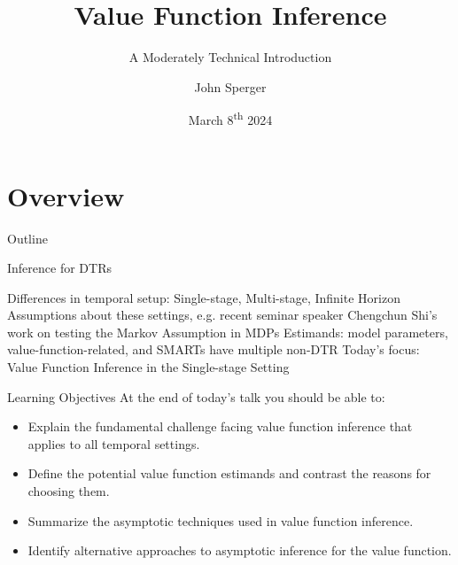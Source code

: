 \documentclass[aspectratio=169, professionalfonts]{beamer}
\author{John Sperger}
\date{March 8\textsuperscript{th} 2024}
\title{Value Function Inference}
\subtitle{A Moderately Technical Introduction}
\begin{document}
\maketitle

\section{Overview}
\begin{frame}{Outline}
	\tableofcontents[hideallsubsections]
\end{frame}

\begin{frame}[label={overview:time}]{Inference for DTRs}

	Differences in temporal setup: Single-stage, Multi-stage, Infinite Horizon
	\vfill
	Assumptions about these settings, e.g. recent seminar speaker Chengchun
	Shi's work on testing the Markov Assumption in MDPs
	\vfill
	Estimands: model parameters, value-function-related, and SMARTs have
	multiple non-DTR
	\vfill \pause
	Today's focus: Value Function Inference in the Single-stage Setting
\end{frame}


\begin{frame}[label={overview:objectives}]{Learning Objectives}
	At the end of today's talk you should be able to:
	\begin{itemize}
		\item Explain the fundamental challenge facing value function inference
		      that applies to all temporal settings.
		\item Define the potential value function estimands and contrast the
		      reasons for choosing them.

		\item Summarize the asymptotic techniques used in value function inference.

		\item Identify alternative approaches to asymptotic inference for the
		      value function.
	\end{itemize}
	\vfill
\end{frame}
\end{document}

